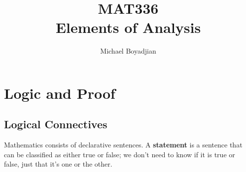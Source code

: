 \documentclass[11pt]{article}
\begin{document}
\title{MAT336  \\ Elements of Analysis}
\author{Michael Boyadjian}
\maketitle
\pagebreak

\tableofcontents

\pagebreak

\bigskip
\bigskip
\bigskip


\section{Logic and Proof}

\subsection{Logical Connectives}
Mathematics consists of declarative sentences. A \textbf{statement} is a sentence that can be classified as either true or false; we don't  need to know if it is true or false, just that it's one or the other. \\
\end{document}
